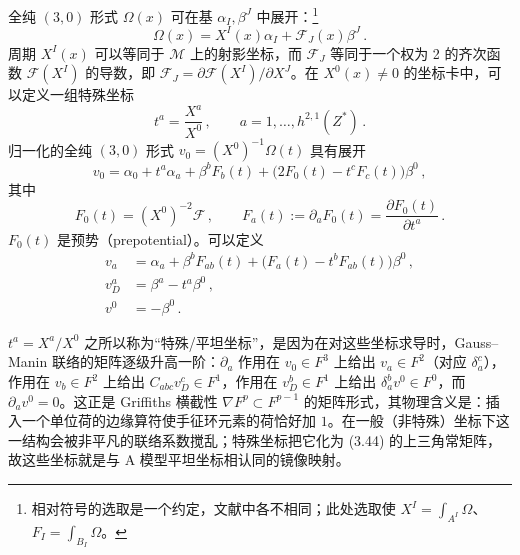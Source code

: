 全纯 $(3,0)$ 形式 $\Omega(x)$ 可在基 $\alpha_I,\beta^J$ 中展开：\footnote{相对符号的选取是一个约定，文献中各不相同；此处选取使 $X^I=\int_{A^I}\Omega$、$F_I=\int_{B_I}\Omega$。}
\begin{equation}\tag{3.37}
\Omega(x)=X^I(x)\alpha_I+\mathcal{F}_J(x)\beta^J\,.
\end{equation}
周期 $X^I(x)$ 可以等同于 $\mathcal{M}$ 上的射影坐标，而 $\mathcal{F}_J$ 等同于一个权为 2 的齐次函数 $\mathcal{F}(X^I)$ 的导数，即 $\mathcal{F}_J=\partial\mathcal{F}(X^I)/\partial X^J$。在 $X^0(x)\neq 0$ 的坐标卡中，可以定义一组特殊坐标
\[
t^a=\frac{X^a}{X^0}\,,\qquad a=1,\ldots,h^{2,1}(Z^*)\,.
\]
归一化的全纯 $(3,0)$ 形式 $v_0=(X^0)^{-1}\Omega(t)$ 具有展开
\begin{equation}\tag{3.38}
v_0=\alpha_0+t^a\alpha_a+\beta^bF_b(t)+\bigl(2F_0(t)-t^cF_c(t)\bigr)\beta^0\,,
\end{equation}
其中
\[
F_0(t)=(X^0)^{-2}\mathcal{F}\,,\qquad
F_a(t):=\partial_aF_0(t)=\frac{\partial F_0(t)}{\partial t^a}\,.
\]
$F_0(t)$ 是预势（prepotential）。可以定义
\begin{align}
v_a&=\alpha_a+\beta^bF_{ab}(t)+\bigl(F_a(t)-t^bF_{ab}(t)\bigr)\beta^0\,, \tag{3.39}\\
v^a_D&=\beta^a-t^a\beta^0\,, \tag{3.40}\\
v^0&=-\beta^0\,. \tag{3.41}
\end{align}
\begin{yizhu}[物理图像]
$t^a=X^a/X^0$ 之所以称为“特殊/平坦坐标”，是因为在对这些坐标求导时，Gauss--Manin 联络的矩阵逐级升高一阶：$\partial_a$ 作用在 $v_0\in F^3$ 上给出 $v_a\in F^2$（对应 $\delta^c_a$），作用在 $v_b\in F^2$ 上给出 $C_{abc}v^c_D\in F^1$，作用在 $v^b_D\in F^1$ 上给出 $\delta^b_a v^0\in F^0$，而 $\partial_a v^0=0$。这正是 Griffiths 横截性 $\nabla F^p\subset F^{p-1}$ 的矩阵形式，其物理含义是：插入一个单位荷的边缘算符使手征环元素的荷恰好加 $1$。在一般（非特殊）坐标下这一结构会被非平凡的联络系数搅乱；特殊坐标把它化为 (3.44) 的上三角常矩阵，故这些坐标就是与 A 模型平坦坐标相认同的镜像映射。
\end{yizhu}

